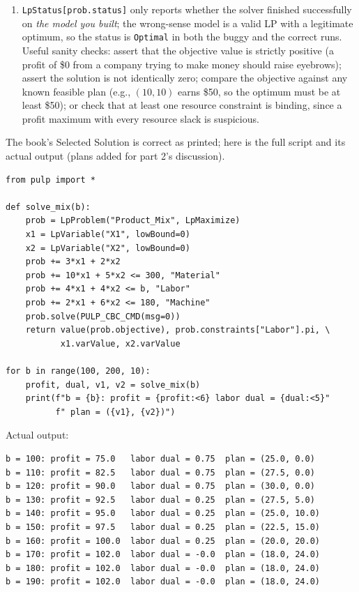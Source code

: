 \begin{enumerate}
\item \texttt{LpStatus[prob.status]} only reports whether the solver finished
successfully on \emph{the model you built}; the wrong-sense model is a valid
LP with a legitimate optimum, so the status is \texttt{Optimal} in both the
buggy and the correct runs. Useful sanity checks: assert that the objective
value is strictly positive (a profit of \$0 from a company trying to make
money should raise eyebrows); assert the solution is not identically zero;
compare the objective against any known feasible plan (e.g., $(10,10)$ earns
\$50, so the optimum must be at least \$50); or check that at least one
resource constraint is binding, since a profit maximum with every resource
slack is suspicious.
\end{enumerate}


The book's Selected Solution is correct as printed; here is the full script
and its actual output (plans added for part 2's discussion).

\begin{verbatim}
from pulp import *

def solve_mix(b):
    prob = LpProblem("Product_Mix", LpMaximize)
    x1 = LpVariable("X1", lowBound=0)
    x2 = LpVariable("X2", lowBound=0)
    prob += 3*x1 + 2*x2
    prob += 10*x1 + 5*x2 <= 300, "Material"
    prob += 4*x1 + 4*x2 <= b, "Labor"
    prob += 2*x1 + 6*x2 <= 180, "Machine"
    prob.solve(PULP_CBC_CMD(msg=0))
    return value(prob.objective), prob.constraints["Labor"].pi, \
           x1.varValue, x2.varValue

for b in range(100, 200, 10):
    profit, dual, v1, v2 = solve_mix(b)
    print(f"b = {b}: profit = {profit:<6} labor dual = {dual:<5}"
          f" plan = ({v1}, {v2})")
\end{verbatim}

Actual output:

\begin{verbatim}
b = 100: profit = 75.0   labor dual = 0.75  plan = (25.0, 0.0)
b = 110: profit = 82.5   labor dual = 0.75  plan = (27.5, 0.0)
b = 120: profit = 90.0   labor dual = 0.75  plan = (30.0, 0.0)
b = 130: profit = 92.5   labor dual = 0.25  plan = (27.5, 5.0)
b = 140: profit = 95.0   labor dual = 0.25  plan = (25.0, 10.0)
b = 150: profit = 97.5   labor dual = 0.25  plan = (22.5, 15.0)
b = 160: profit = 100.0  labor dual = 0.25  plan = (20.0, 20.0)
b = 170: profit = 102.0  labor dual = -0.0  plan = (18.0, 24.0)
b = 180: profit = 102.0  labor dual = -0.0  plan = (18.0, 24.0)
b = 190: profit = 102.0  labor dual = -0.0  plan = (18.0, 24.0)
\end{verbatim}

